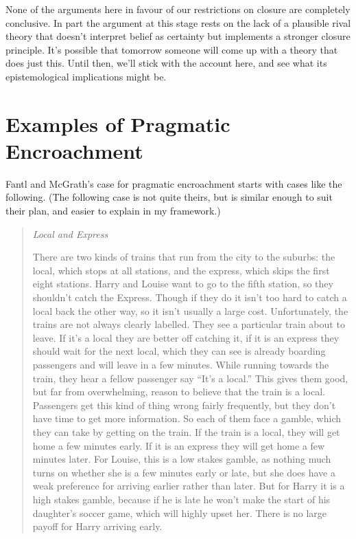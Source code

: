 \documentclass[
  11pt,
  letterpaper,
  DIV=11,
  numbers=noendperiod,
  oneside]{scrartcl}
\begin{document}
None of the arguments here in favour of our restrictions on closure are
completely conclusive. In part the argument at this stage rests on the
lack of a plausible rival theory that doesn't interpret belief as
certainty but implements a stronger closure principle. It's possible
that tomorrow someone will come up with a theory that does just this.
Until then, we'll stick with the account here, and see what its
epistemological implications might be.

\section{Examples of Pragmatic
Encroachment}\label{examples-of-pragmatic-encroachment}

Fantl and McGrath's case for pragmatic encroachment starts with cases
like the following. (The following case is not quite theirs, but is
similar enough to suit their plan, and easier to explain in my
framework.)

\begin{quote}
\emph{Local and Express}

There are two kinds of trains that run from the city to the suburbs: the
local, which stops at all stations, and the express, which skips the
first eight stations. Harry and Louise want to go to the fifth station,
so they shouldn't catch the Express. Though if they do it isn't too hard
to catch a local back the other way, so it isn't usually a large cost.
Unfortunately, the trains are not always clearly labelled. They see a
particular train about to leave. If it's a local they are better off
catching it, if it is an express they should wait for the next local,
which they can see is already boarding passengers and will leave in a
few minutes. While running towards the train, they hear a fellow
passenger say ``It's a local.'' This gives them good, but far from
overwhelming, reason to believe that the train is a local. Passengers
get this kind of thing wrong fairly frequently, but they don't have time
to get more information. So each of them face a gamble, which they can
take by getting on the train. If the train is a local, they will get
home a few minutes early. If it is an express they will get home a few
minutes later. For Louise, this is a low stakes gamble, as nothing much
turns on whether she is a few minutes early or late, but she does have a
weak preference for arriving earlier rather than later. But for Harry it
is a high stakes gamble, because if he is late he won't make the start
of his daughter's soccer game, which will highly upset her. There is no
large payoff for Harry arriving early.
\end{quote}
\end{document}
